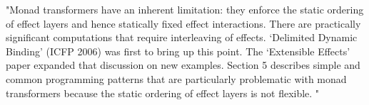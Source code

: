 "Monad transformers have an inherent limitation:
they enforce the static ordering of effect layers and hence statically fixed effect interactions.
There are practically significant computations that require interleaving of effects.
‘Delimited Dynamic Binding’ (ICFP 2006) was first to bring up this point.
The ‘Extensible Effects’ paper expanded that discussion on new examples.
Section 5 describes simple and common programming patterns that are particularly
problematic with monad transformers because the static ordering of effect layers is not flexible.
"

